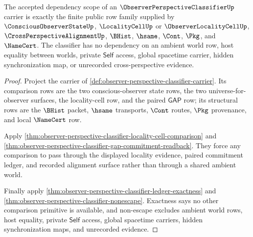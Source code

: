\begin{theorem}
\label{thm:observer-perspective-classifier-dependency-scope}
The accepted dependency scope of an $\ObserverPerspectiveClassifierUp$ carrier is exactly the finite public row family supplied by $\ConsciousObserverStateUp$, $\LocalityCellUp$ or $\ObserverLocalityCellUp$, $\CrossPerspectiveAlignmentUp$, $\BHist$, $\hsame$, $\Cont$, $\Pkg$, and $\NameCert$. The classifier has no dependency on an ambient world row, host equality between worlds, private $\mathsf{Self}$ access, global spacetime carrier, hidden synchronization map, or unrecorded cross-perspective evidence.
\end{theorem}
\begin{proof}
Project the carrier of \autoref{def:observer-perspective-classifier-carrier}. Its comparison rows are the two conscious-observer state rows, the two universe-for-observer surfaces, the locality-cell row, and the paired $\mathsf{GAP}$ row; its structural rows are the $\BHist$ packet, $\hsame$ transports, $\Cont$ routes, $\Pkg$ provenance, and local $\NameCert$ row.

Apply \autoref{thm:observer-perspective-classifier-locality-cell-comparison} and \autoref{thm:observer-perspective-classifier-gap-commitment-readback}. They force any comparison to pass through the displayed locality evidence, paired commitment ledger, and recorded alignment surface rather than through a shared ambient world.

Finally apply \autoref{thm:observer-perspective-classifier-ledger-exactness} and \autoref{thm:observer-perspective-classifier-nonescape}. Exactness says no other comparison primitive is available, and non-escape excludes ambient world rows, host equality, private $\mathsf{Self}$ access, global spacetime carriers, hidden synchronization maps, and unrecorded evidence.
\end{proof}

